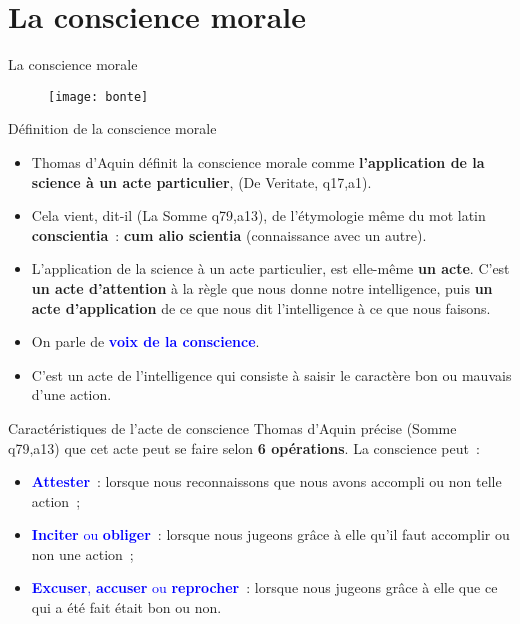 \documentclass[11pt,xcolor=dvipsname,ignorenonframetext,handout]{beamer}
\begin{document}
\section{La conscience morale}
\begin{frame}{La conscience morale}
    {
        \begin{figure}
          \centering
          \texttt{[image: bonte]}
        \end{figure}
          }    
\end{frame}
\begin{frame}{Définition de la conscience morale}
    \begin{itemize}
        \rightskip=0pt\leftskip=0pt
        \item Thomas d'Aquin définit la conscience morale comme \textbf{l'application de la science à un acte particulier}, (De Veritate, q17,a1).
        \item Cela vient, dit-il (La Somme q79,a13), de l'étymologie même du mot latin \textbf{conscientia}~: \textbf{cum alio scientia} (connaissance avec un autre).
        \item L'application de la science à un acte particulier, est elle-même \textbf{un acte}. C'est \textbf{un acte d'attention} à la règle que nous donne notre intelligence, puis \textbf{un acte d'application} de ce que nous dit l'intelligence à ce que nous faisons.
        \item On parle de \textcolor{blue}{\textbf{voix de la conscience}}.
        \item C'est un acte de l'intelligence qui consiste à saisir le caractère bon ou mauvais d'une action.
    \end{itemize}
\end{frame}
\begin{frame}{Caractéristiques de l'acte de conscience}
    Thomas d'Aquin précise (Somme q79,a13) que cet acte peut se faire selon \textbf{6 opérations}. La conscience peut~:
    \begin{itemize}
        \rightskip=0pt\leftskip=0pt
        \item \textcolor{blue}{\textbf{Attester}}~: lorsque nous reconnaissons que nous avons accompli ou non telle action~;
        \item \textcolor{blue}{\textbf{Inciter} ou \textbf{obliger}}~: lorsque nous jugeons grâce à elle qu'il faut accomplir ou non une action~;
        \item \textcolor{blue}{\textbf{Excuser}, \textbf{accuser} ou \textbf{reprocher}}~: lorsque nous jugeons grâce à elle que ce qui a été fait était bon ou non.
    \end{itemize}
\end{frame}
\end{document}
